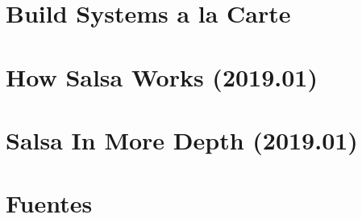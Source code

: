 \documentclass[12pt, a4paper]{report}
\begin{document}
  \section*{Build Systems a la Carte}
  \cite{mokhov2018build}

  \section*{How Salsa Works (2019.01)}
  \cite{niko2019salsaworks}

  \section*{Salsa In More Depth (2019.01)}
  \cite{niko2019salsadepth}

  \section*{Fuentes}
\end{document}
